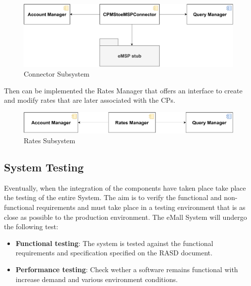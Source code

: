 \begin{figure}[H]
    \centering
    \includegraphics[scale=0.6]{src/Integration/CPMSConnector.pdf}
    \caption{Connector Subsystem}
\end{figure}
Then can be implemented the Rates Manager that offers an interface to create and modify rates that
are later associated with the CPs.
\begin{figure}[H]
    \centering
    \includegraphics[scale=0.6]{src/Integration/CPMSRates.pdf}
    \caption{Rates Subsystem}
\end{figure}



\subsection{System Testing}
Eventually, when the integration of the components have taken place take place the testing of the entire System. 
The aim is to verify the functional and non-functional requirements and must take place in a testing
environment that is as close as possible to the production environment. 
The eMall System will undergo the following test:
\begin{itemize}
    \item \textbf{Functional testing}: The system is tested against the functional requirements and specification 
    specified on the RASD document.
    \item \textbf{Performance testing}: Check wether a software remains functional with increase demand and 
    various environment conditions.
\end{itemize}
